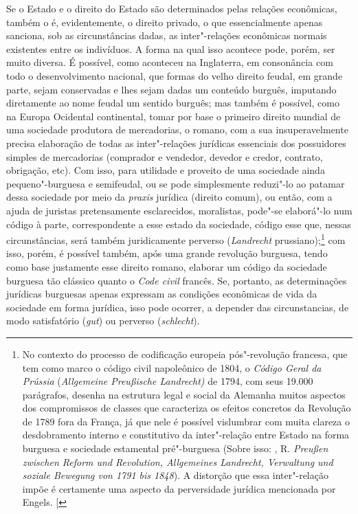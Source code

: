 Se o Estado e o direito do Estado são determinados pelas relações
econômicas, também o é, evidentemente, o direito privado, o que
essencialmente apenas sanciona, sob as circunstâncias dadas, as
inter"-relações econômicas normais existentes entre os indivíduos. A
forma na qual isso acontece pode, porém, ser muito diversa. É possível,
como aconteceu na Inglaterra, em consonância com todo o desenvolvimento
nacional, que formas do velho direito feudal, em grande parte, sejam
conservadas e lhes sejam dadas um conteúdo burguês, imputando
diretamente ao nome feudal um sentido burguês; mas também é possível,
como na Europa Ocidental continental, tomar por base o primeiro direito
mundial de uma sociedade produtora de mercadorias, o romano, com a sua
insuperavelmente precisa elaboração de todas as inter"-relações jurídicas
essenciais dos possuidores simples de mercadorias (comprador e vendedor,
devedor e credor, contrato, obrigação, etc). Com isso, para utilidade e
proveito de uma sociedade ainda pequeno"-burguesa e semifeudal, ou se
pode simplesmente reduzi"-lo ao patamar dessa sociedade por meio da
\emph{praxis} jurídica (direito comum), ou então, com a ajuda de
juristas pretensamente esclarecidos, moralistas, pode"-se elaborá"-lo num
código à parte, correspondente a esse estado da sociedade, código esse
que, nessas circunstâncias, será também juridicamente perverso
(\emph{Landrecht} prussiano);\footnote{No contexto do processo de codificação europeia pós"-revolução francesa, que tem como marco o código civil napoleônico de 1804, o
  \emph{Código Geral da Prússia} (\emph{Allgemeine Preußische
  Landrecht)} de 1794, com seus 19.000 parágrafos, desenha na estrutura
  legal e social da Alemanha muitos aspectos dos compromissos de classes
  que caracteriza os efeitos concretos da Revolução de 1789 fora da
  França, já que nele é possível vislumbrar com muita clareza o
  desdobramento interno e constitutivo da inter"-relação entre Estado na
  forma burguesa e sociedade estamental pré"-burguesa (Sobre isso:
  , R. \emph{Preußen zwischen Reform und Revolution,
  Allgemeines Landrecht, Verwaltung und soziale Bewegung von 1791 bis
  1848}). A distorção que essa inter"-relação impõe é certamente uma
  aspecto da perversidade jurídica mencionada por Engels. {[}\versal{N.\,T.}{]}} com isso,
porém, é possível também, após uma grande revolução burguesa, tendo como
base justamente esse direito romano, elaborar um código da sociedade
burguesa tão clássico quanto o \emph{Code
civil} francês. Se, portanto, as
determinações jurídicas burguesas apenas expressam as condições
econômicas de vida da sociedade em forma jurídica, isso pode ocorrer, a
depender das circunstancias, de modo satisfatório (\emph{gut}) ou
perverso (\emph{schlecht}).

